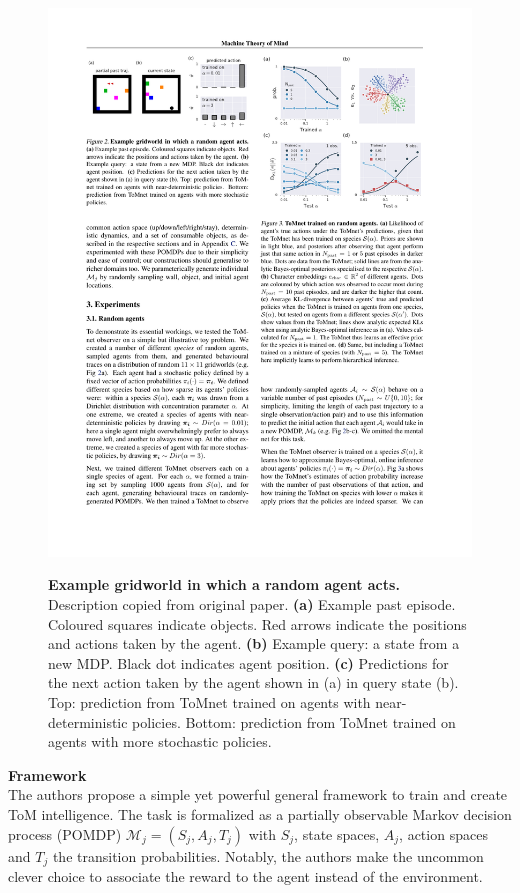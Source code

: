 \documentclass[twocolumn,superscriptaddress,aps]{revtex4-1}
\begin{document}
\begin{figure}[!htb]
\includegraphics[width=\linewidth, height=\textheight, keepaspectratio]{figs/exp1-1}
\label{fig:exp11}
\caption{\textbf{Example gridworld in which a random agent acts.} Description copied from original paper. \textbf{(a)} Example past episode. Coloured squares indicate objects. Red
arrows indicate the positions and actions taken by the agent. \textbf{(b)} Example query: a state from a new MDP. Black dot indicates
agent position. \textbf{(c)} Predictions for the next action taken by the agent shown in (a) in query state (b). Top: prediction from ToMnet trained on agents with near-deterministic policies. Bottom: prediction from ToMnet trained on agents with more stochastic policies.}
\end{figure}

\noindent \textbf{Framework} \\[0.15cm]
The authors propose a simple yet powerful general framework to train and create ToM intelligence. The task is formalized as a partially observable Markov decision process (POMDP) $\mathcal{M}_j = (S_j,A_j,T_j)$ with $S_j$, state spaces, $A_j$, action spaces and $T_j$ the transition probabilities. Notably, the authors make the uncommon clever choice to associate the reward to the agent instead of the environment.\\
\end{document}
